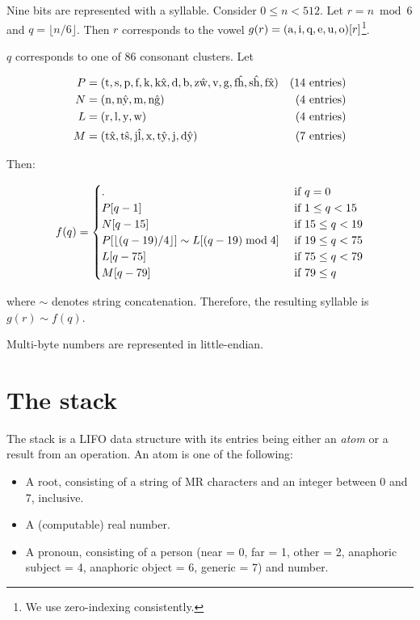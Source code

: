 \documentclass{book}
\begin{document}
Nine bits are represented with a syllable. Consider $0 \le n < 512$. Let $r = n \bmod 6$ and $q = \lfloor n / 6 \rfloor$. Then $r$ corresponds to the vowel $g(r) = (\text{{\normalfont a}}, \text{{\normalfont i}}, \text{{\normalfont q}}, \text{{\normalfont e}}, \text{{\normalfont u}}, \text{{\normalfont o}})[r]$\footnote{We use zero-indexing consistently.}.

$q$ corresponds to one of 86 consonant clusters. Let

\begin{align}
    P &= (\text{{\normalfont t}}, \text{{\normalfont s}}, \text{{\normalfont p}}, \text{{\normalfont f}}, \text{{\normalfont k}}, \text{{\normalfont k\^x}}, \text{{\normalfont d}}, \text{{\normalfont b}}, \text{{\normalfont z\^w}}, \text{{\normalfont v}}, \text{{\normalfont g}}, \text{{\normalfont f\^h}}, \text{{\normalfont s\^h}}, \text{{\normalfont f\^x}}) & \text{(14 entries)} \\
    N &= (\text{{\normalfont n}}, \text{{\normalfont n\^y}}, \text{{\normalfont m}}, \text{{\normalfont n\^g}}) & \text{(4 entries)} \\
    L &= (\text{{\normalfont r}}, \text{{\normalfont l}}, \text{{\normalfont y}}, \text{{\normalfont w}}) & \text{(4 entries)} \\
    M &= (\text{{\normalfont t\^x}}, \text{{\normalfont t\^s}}, \text{{\normalfont j\^l}}, \text{{\normalfont x}}, \text{{\normalfont t\^y}}, \text{{\normalfont j}}, \text{{\normalfont d\^y}}) & \text{(7 entries)}
\end{align}

Then:

\begin{equation}
    f(q) = \begin{cases}
        \text{{\normalfont.}} & \text{ if } q = 0 \\
        P[q - 1] & \text{ if } 1 \le q < 15 \\
        N[q - 15] & \text{ if } 15 \le q < 19 \\
        P[\lfloor (q - 19) / 4 \rfloor] \sim L[(q - 19) \bmod 4] & \text{ if } 19 \le q < 75 \\
        L[q - 75] & \text{ if } 75 \le q < 79 \\
        M[q - 79] & \text{ if } 79 \le q
    \end{cases}
\end{equation}

where $\sim$ denotes string concatenation. Therefore, the resulting syllable is $g(r) \sim f(q)$.

Multi-byte numbers are represented in little-endian.

\section{The stack}

The stack is a LIFO data structure with its entries being either an \emph{atom} or a result from an operation. An atom is one of the following:

\begin{itemize}
    \item A root, consisting of a string of MR characters and an integer between 0 and 7, inclusive.
    \item A (computable) real number.
    \item A pronoun, consisting of a person (near = 0, far = 1, other = 2, anaphoric subject = 4, anaphoric object = 6, generic = 7) and number.
\end{itemize}
\end{document}
